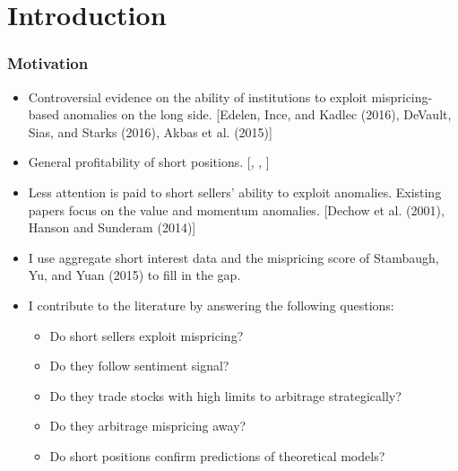 \documentclass{beamer}
\begin{document}
\section{Introduction}
\begin{frame}
	\frametitle{Motivation}
	
	\begin{itemize}
		\item Controversial evidence on the ability of institutions to exploit mispricing-based anomalies  on the long side. {\scriptsize[Edelen, Ince, and Kadlec (2016), DeVault, Sias, and Starks (2016), Akbas et al. (2015)]}
		\item General profitability of short positions. {\scriptsize[\citet{desai_investigation_2002}, \citet{boehmer_which_2008}, \citet{diether_short-sale_2009}]} 
		\item Less attention is paid to short sellers' ability to exploit anomalies. Existing papers focus on the value and momentum anomalies. {\scriptsize[Dechow et al. (2001), Hanson and Sunderam (2014)]}
		\item I use aggregate short interest data and the mispricing score of Stambaugh, Yu, and Yuan (2015) to fill in the gap.
		\item I contribute to the literature by answering the following questions:
		\begin{itemize}

			\vspace*{0.1cm}
			\item Do short sellers exploit mispricing?
			\item Do they follow sentiment signal?
			\item Do they trade stocks with high limits to arbitrage strategically?
			\item Do they arbitrage mispricing away?
			\item Do short positions confirm predictions of theoretical models? 
		\end{itemize}
	\end{itemize}
\end{frame}
\end{document}
